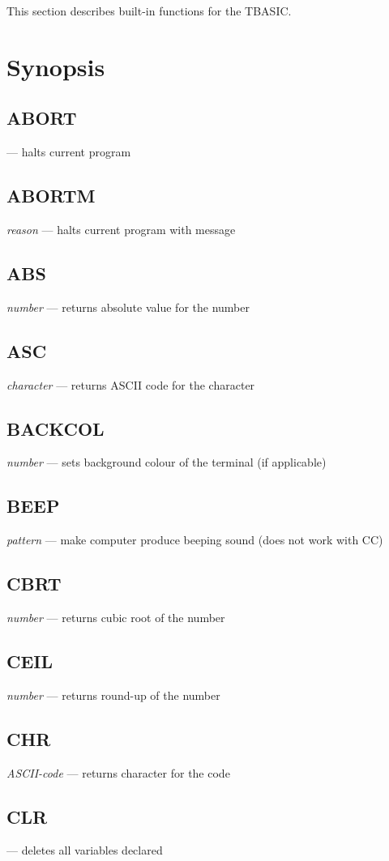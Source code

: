 This section describes built-in functions for the TBASIC.

\section{Synopsis}

\subsection{ABORT} --- halts current program
\subsection{ABORTM} \emph{reason} --- halts current program with message
\subsection{ABS} \emph{number} --- returns absolute value for the number
\subsection{ASC} \emph{character} --- returns ASCII code for the character
\subsection{BACKCOL} \emph{number} --- sets background colour of the terminal (if applicable)
\subsection{BEEP} \emph{pattern} --- make computer produce beeping sound (does not work with CC)
\subsection{CBRT} \emph{number} --- returns cubic root of the number
\subsection{CEIL} \emph{number} --- returns round-up of the number
\subsection{CHR} \emph{ASCII-code} --- returns character for the code
\subsection{CLR} --- deletes all variables declared

